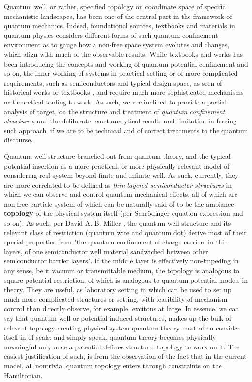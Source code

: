 Quantum well, or rather, specified topology on coordinate space of specific mechanistic landscapes, has been one of the central part in the framework of quantum mechanics. Indeed, foundational sources, textbooks and materials in quantum physics considers different forms of such quantum confinement environment as to gauge how a non-free space system evolutes and changes, which align with much of the observable results. While textbooks and works \cite{griffiths2018,sakurai2017,landau1981} has been introducing the concepts and working of quantum potential confinement and so on, the inner working of systems in practical setting or of more complicated requirements, such as semiconductors and typical design space, as seen of historical works or textbooks \cite{kane1957,chang1980,kittel2005,bastard1988,davies1998,harrison2016,weisbuch1991,haugkoch2009,yu2010,barsan2016,esaki1974}, and require much more sophisticated mechanisms or theoretical tooling to work. As such, we are inclined to provide a partial analysis of target, on the structure and treatment of \textit{quantum confinement structures}, and the deliberate exact analytical results and limitation in forcing such approach, if we are to be technical and of correct treatments to the quantum discourse. 

Quantum well structure branched out from quantum theory, and the typical potential insertion as a more practical, or more physically relevant model of considering real system beyond finite and infinite well. As such, currently, they are more correlated to be defined as \textit{thin layered semiconductor structures} in which we can observe and control quantum mechanical effects, all of which are non-free particle system of which can be naturally said of to be the ambiance \textbf{topology} of the physical system itself (per Schrödinger equation expression and so on). As such, per David A. B. Miller \cite{David2020OpticalPO}, the quantum well structure and its relevant class of restriction (quantum wire and quantum dot) derive most of their special properties from "the quantum confinement of charge carriers in thin layers, of one semiconductor well material sandwiched between other semiconductor barrier layers". If the middle layer is effectively non-impeding in any sense, be it vacuum or transmittable medium, the topology is analogous to square potential restriction, of which is analogous to quantum potential models in theory. They are useful, as laboratory setting in which can be used to set up much more complicated structures or setting, with feasibility of mechanism control than directly observe, for example, excitons at large. In essence, we can say that quantum well or potential-induced structures, makes up the bulk of relevant topology-creating physical system quantum theory most often consider itself in of scale; and simply speak, quantum theory becomes physically meaningful only once a potential defines structural topology to work on it. The easiest justification of such, is from the observation of the fact that in the current model, all nontrivial quantum topology enters through constraints on the Hamiltonian.

